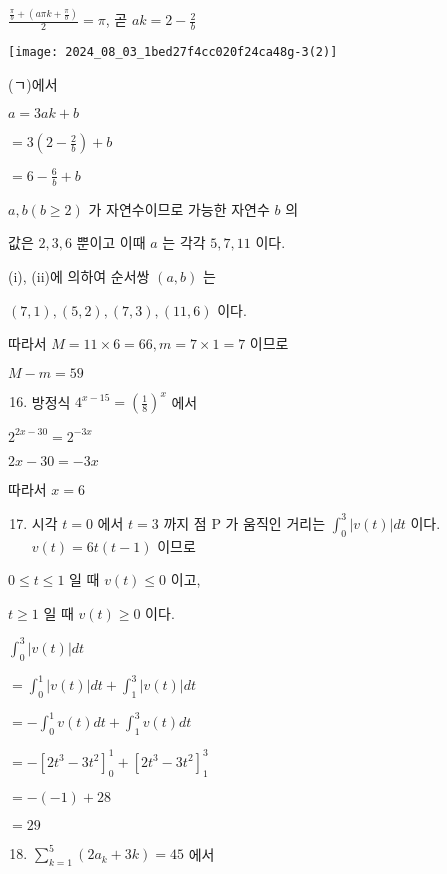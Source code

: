 \documentclass[10pt]{article}
\begin{document}
\(\frac{\frac{\pi}{b}+\left(a \pi k+\frac{\pi}{b}\right)}{2}=\pi\), 곧 \(a k=2-\frac{2}{b}\)

\begin{center}
\texttt{[image: 2024\_08\_03\_1bed27f4cc020f24ca48g-3(2)]}
\end{center}

(ㄱ)에서

\(a=3 a k+b\)

\(=3\left(2-\frac{2}{b}\right)+b\)

\(=6-\frac{6}{b}+b\)

\(a, b(b \geq 2)\) 가 자연수이므로 가능한 자연수 \(b\) 의

값은 \(2,3,6\) 뿐이고 이때 \(a\) 는 각각 \(5,7,11\) 이다.

(i), (ii)에 의하여 순서쌍 \((a, b)\) 는

\((7,1),(5,2),(7,3),(11,6)\) 이다.

따라서 \(M=11 \times 6=66, m=7 \times 1=7\) 이므로

\(M-m=59\)

\begin{enumerate}
  \setcounter{enumi}{15}
  \item 방정식 \(4^{x-15}=\left(\frac{1}{8}\right)^{x}\) 에서
\end{enumerate}

\(2^{2 x-30}=2^{-3 x}\)

\(2 x-30=-3 x\)

따라서 \(x=6\)

\begin{enumerate}
  \setcounter{enumi}{16}
  \item 시각 \(t=0\) 에서 \(t=3\) 까지 점 P 가 움직인 거리는 \(\int_{0}^{3}|v(t)| d t\) 이다. \(v(t)=6 t(t-1)\) 이므로
\end{enumerate}

\(0 \leq t \leq 1\) 일 때 \(v(t) \leq 0\) 이고,

\(t \geq 1\) 일 때 \(v(t) \geq 0\) 이다.

\(\int_{0}^{3}|v(t)| d t\)

\(=\int_{0}^{1}|v(t)| d t+\int_{1}^{3}|v(t)| d t\)

\(=-\int_{0}^{1} v(t) d t+\int_{1}^{3} v(t) d t\)

\(=-\left[2 t^{3}-3 t^{2}\right]_{0}^{1}+\left[2 t^{3}-3 t^{2}\right]_{1}^{3}\)

\(=-(-1)+28\)

\(=29\)

\begin{enumerate}
  \setcounter{enumi}{17}
  \item \(\sum_{k=1}^{5}\left(2 a_{k}+3 k\right)=45\) 에서
\end{enumerate}
\end{document}

